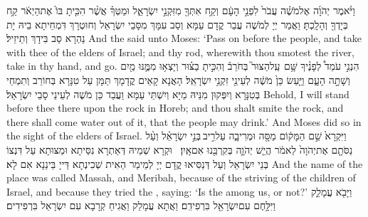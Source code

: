 {וַיֹּ֨אמֶר יְהֹוָ֜ה אֶל\maqqaf מֹשֶׁ֗ה עֲבֹר֙ לִפְנֵ֣י הָעָ֔ם וְקַ֥ח אִתְּךָ֖ מִזִּקְנֵ֣י יִשְׂרָאֵ֑ל וּמַטְּךָ֗ אֲשֶׁ֨ר הִכִּ֤יתָ בּוֹ֙ אֶת\maqqaf הַיְאֹ֔ר קַ֥ח בְּיָדְךָ֖ וְהָלָֽכְתָּ׃}
{וַאֲמַר יְיָ לְמֹשֶׁה עֲבַר קֳדָם עַמָּא וְסַב עִמָּךְ מִסָּבֵי יִשְׂרָאֵל וְחוּטְרָךְ דִּמְחֵיתָא בֵיהּ יָת נַהְרָא סַב בִּידָךְ וְתֵיזֵיל׃}
{And the \lord\space said unto Moses: ‘Pass on before the people, and take with thee of the elders of Israel; and thy rod, wherewith thou smotest the river, take in thy hand, and go.}{}
{הִנְנִ֣י עֹמֵד֩ לְפָנֶ֨יךָ שָּׁ֥ם \pasek  עַֽל\maqqaf הַצּוּר֮ בְּחֹרֵב֒ וְהִכִּ֣יתָ בַצּ֗וּר וְיָצְא֥וּ מִמֶּ֛נּוּ מַ֖יִם וְשָׁתָ֣ה הָעָ֑ם וַיַּ֤עַשׂ כֵּן֙ מֹשֶׁ֔ה לְעֵינֵ֖י זִקְנֵ֥י יִשְׂרָאֵֽל׃}
{הָאֲנָא קָאֵים קֳדָמָךְ תַּמָּן עַל טִנָּרָא בְּחוֹרֵב וְתִמְחֵי בְּטִנָּרָא וְיִפְּקוּן מִנֵּיהּ מַיָּא וְיִשְׁתֵּי עַמָּא וַעֲבַד כֵּן מֹשֶׁה לְעֵינֵי סָבֵי יִשְׂרָאֵל׃}
{Behold, I will stand before thee there upon the rock in Horeb; and thou shalt smite the rock, and there shall come water out of it, that the people may drink.’ And Moses did so in the sight of the elders of Israel.}{}
{וַיִּקְרָא֙ שֵׁ֣ם הַמָּק֔וֹם מַסָּ֖ה וּמְרִיבָ֑ה עַל\maqqaf רִ֣יב \legarmeh  בְּנֵ֣י יִשְׂרָאֵ֗ל וְעַ֨ל נַסֹּתָ֤ם אֶת\maqqaf יְהֹוָה֙ לֵאמֹ֔ר הֲיֵ֧שׁ יְהֹוָ֛ה בְּקִרְבֵּ֖נוּ אִם\maqqaf אָֽיִן׃ \petucha }
{וּקְרָא שְׁמֵיהּ דְּאַתְרָא נִסֵּיתָא וּמַצּוּתָא עַל דִּנְצוֹ בְּנֵי יִשְׂרָאֵל וְעַל דְּנַסִּיאוּ קֳדָם יְיָ לְמֵימַר הַאִית שְׁכִינְתָא דַּייָ בֵּינַנָא אִם לָא׃}
{And the name of the place was called Massah, and Meribah, because of the striving of the children of Israel, and because they tried the \lord, saying: ‘Is the \lord\space among us, or not?’}{}
{וַיָּבֹ֖א עֲמָלֵ֑ק וַיִּלָּ֥חֶם עִם\maqqaf יִשְׂרָאֵ֖ל בִּרְפִידִֽם׃}
{וַאֲתָא עֲמָלֵק וַאֲגִיחַ קְרָבָא עִם יִשְׂרָאֵל בִּרְפִידִים׃}
